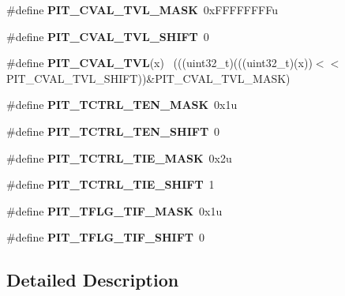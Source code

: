 \begin{DoxyCompactItemize}
\item 
\hypertarget{group___p_i_t___register___masks_ga2810b877338372cb9b9d944b206c08d3}{}\#define {\bfseries P\+I\+T\+\_\+\+C\+V\+A\+L\+\_\+\+T\+V\+L\+\_\+\+M\+A\+S\+K}~0x\+F\+F\+F\+F\+F\+F\+F\+Fu\label{group___p_i_t___register___masks_ga2810b877338372cb9b9d944b206c08d3}

\item 
\hypertarget{group___p_i_t___register___masks_ga28753a1a45034ccd34e052faa3e02ff0}{}\#define {\bfseries P\+I\+T\+\_\+\+C\+V\+A\+L\+\_\+\+T\+V\+L\+\_\+\+S\+H\+I\+F\+T}~0\label{group___p_i_t___register___masks_ga28753a1a45034ccd34e052faa3e02ff0}

\item 
\hypertarget{group___p_i_t___register___masks_ga2fb557548a66d3bcc505e50f298bf1df}{}\#define {\bfseries P\+I\+T\+\_\+\+C\+V\+A\+L\+\_\+\+T\+V\+L}(x)                                                ~(((uint32\+\_\+t)(((uint32\+\_\+t)(x))$<$$<$P\+I\+T\+\_\+\+C\+V\+A\+L\+\_\+\+T\+V\+L\+\_\+\+S\+H\+I\+F\+T))\&P\+I\+T\+\_\+\+C\+V\+A\+L\+\_\+\+T\+V\+L\+\_\+\+M\+A\+S\+K)\label{group___p_i_t___register___masks_ga2fb557548a66d3bcc505e50f298bf1df}

\item 
\hypertarget{group___p_i_t___register___masks_ga1099670711f996f5fa84e33bbfe794b2}{}\#define {\bfseries P\+I\+T\+\_\+\+T\+C\+T\+R\+L\+\_\+\+T\+E\+N\+\_\+\+M\+A\+S\+K}~0x1u\label{group___p_i_t___register___masks_ga1099670711f996f5fa84e33bbfe794b2}

\item 
\hypertarget{group___p_i_t___register___masks_ga0080137ff0378087f08cc12fd10b3e1f}{}\#define {\bfseries P\+I\+T\+\_\+\+T\+C\+T\+R\+L\+\_\+\+T\+E\+N\+\_\+\+S\+H\+I\+F\+T}~0\label{group___p_i_t___register___masks_ga0080137ff0378087f08cc12fd10b3e1f}

\item 
\hypertarget{group___p_i_t___register___masks_ga99639aabcac1d6042d14e7893d00bf67}{}\#define {\bfseries P\+I\+T\+\_\+\+T\+C\+T\+R\+L\+\_\+\+T\+I\+E\+\_\+\+M\+A\+S\+K}~0x2u\label{group___p_i_t___register___masks_ga99639aabcac1d6042d14e7893d00bf67}

\item 
\hypertarget{group___p_i_t___register___masks_gae21aee9e81741a924c9f2824fbc5775b}{}\#define {\bfseries P\+I\+T\+\_\+\+T\+C\+T\+R\+L\+\_\+\+T\+I\+E\+\_\+\+S\+H\+I\+F\+T}~1\label{group___p_i_t___register___masks_gae21aee9e81741a924c9f2824fbc5775b}

\item 
\hypertarget{group___p_i_t___register___masks_ga9de8d708b43c9ca35df26c7b43f09769}{}\#define {\bfseries P\+I\+T\+\_\+\+T\+F\+L\+G\+\_\+\+T\+I\+F\+\_\+\+M\+A\+S\+K}~0x1u\label{group___p_i_t___register___masks_ga9de8d708b43c9ca35df26c7b43f09769}

\item 
\hypertarget{group___p_i_t___register___masks_gaf6f5ddca2193ed04bc61bc3e899f5ced}{}\#define {\bfseries P\+I\+T\+\_\+\+T\+F\+L\+G\+\_\+\+T\+I\+F\+\_\+\+S\+H\+I\+F\+T}~0\label{group___p_i_t___register___masks_gaf6f5ddca2193ed04bc61bc3e899f5ced}

\end{DoxyCompactItemize}


\subsection{Detailed Description}
